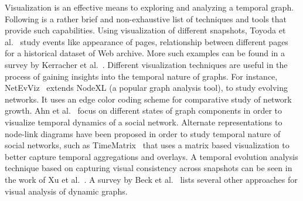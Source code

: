 \documentclass{svjour3}
\begin{document}
Visualization is an effective means to exploring and analyzing a temporal graph. Following is a rather brief and non-exhaustive list of techniques and tools that provide such capabilities. 
Using visualization of different snapshots, Toyoda et al.~\cite{toyoda2005system} study events like appearance of pages, relationship between different pages for a historical dataset of Web archive.
More such examples can be found in a survey by Kerracher et al.~\cite{kerracher2015task}. Different visualization techniques are useful in the process of gaining insights into the temporal nature of graphs. For instance, NetEvViz~\cite{khurana2011visual} extends NodeXL (a popular graph analysis tool), to study evolving networks. It uses an edge color coding scheme for comparative study of network growth. Ahn et al.~\cite{ahn2011temporal} focus on different states of graph components in order to visualize temporal dynamics of a social network.
Alternate representations to node-link diagrams have been proposed in order to study temporal nature of social networks, such as TimeMatrix~\cite{yi2010timematrix} that uses a matrix based visualization to better capture temporal aggregations and overlays. A temporal evolution analysis technique based on capturing visual consistency across snapshots can be seen in the work of Xu et al.~\cite{xu2011visualizing}.
A survey by Beck et al.~\cite{beck2014state} lists several other approaches for visual analysis of dynamic graphs. 





\end{document}
